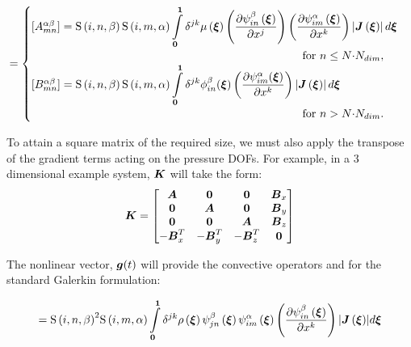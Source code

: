 \begin{equation}
 [K^{\alpha\beta}_{mn}]=
 \begin{cases}
   [A^{\alpha\beta}_{mn}] =  {\idxgsf{i}{n}{\beta}{\idxgsf{i}{m}{\alpha}}}
    \dintl{\vectr{0}}{\vectr{1}}{\delta^{jk}\fnof{\mu}{\vectr{\xi}}}\pbrac{\delby{\idxgbfn{i}{n}{\beta}{\vectr{\xi}}}{x^{j}}}
       \pbrac{\delby{\idxgbfn{i}{m}{\alpha}{\vectr{\xi}}}{x^{k}}}
       \abs{\fnof{\matr{J}}{\vectr{\xi}}}d{\vectr{\xi}}\\
     \qquad\qquad\qquad\qquad\qquad\qquad\qquad\qquad\qquad\qquad\qquad\qquad \text{for $n\le{N{\cdot}{N_{dim}}}$},\\

   [B^{\alpha\beta}_{mn}] = \idxgsf{i}{n}{\beta}\idxgsf{i}{m}{\alpha}
     \dintl{\vectr{0}}{\vectr{1}}\delta^{jk}\phi_{in}^{\beta}({\vectr{\xi}})
     \pbrac{\delby{\psi_{im}^{\alpha}({\vectr{\xi}})}{x^{k}}}\abs{\fnof{\matr{J}}{\vectr{\xi}}}d\vectr{\xi}\\
    \qquad\qquad\qquad\qquad\qquad\qquad\qquad\qquad\qquad\qquad\qquad\qquad \text{for $n>{N{\cdot}{N_{dim}}}$}.
 \end{cases}
\end{equation}

To attain a square matrix of the required size, we must also apply the transpose of the gradient terms acting on the pressure DOFs. For example, in a 3 dimensional example system, $\matr{K}$ will take the form: 
\begin{equation}
  \matr{K}=
   \begin{bmatrix}
     \matr{A} & \matr{0} & \matr{0} & \matr{B}_x\\
     \matr{0} & \matr{A} & \matr{0} & \matr{B}_y\\
     \matr{0} & \matr{0} & \matr{A} & \matr{B}_z\\
     -\matr{B}^T_{x}& -\matr{B}^T_{y} & -\matr{B}^T_z & \matr{0}
   \end{bmatrix}
\end{equation}

The nonlinear vector, $\boldsymbol{g}(t)$ will provide the convective operators and for the standard Galerkin formulation:

\begin{equation}
 [g^{\alpha\beta}_{mn}]=
 {\idxgsf{i}{n}{\beta}}^2{\idxgsf{i}{m}{\alpha}}
   \dintl{\vectr{0}}{\vectr{1}}\delta^{jk}{\fnof{\rho}{\vectr{\xi}}\idxgbfn{j}{n}{\beta}{\vectr{\xi}}
   \idxgbfn{i}{m}{\alpha}{\vectr{\xi}}
     \pbrac{\delby{\idxgbfn{i}{n}{\beta}{\vectr{\xi}}}{x^{k}}}
  \abs{\fnof{\matr{J}}{\vectr{\xi}}}}d{\vectr{\xi}}
\end{equation}

